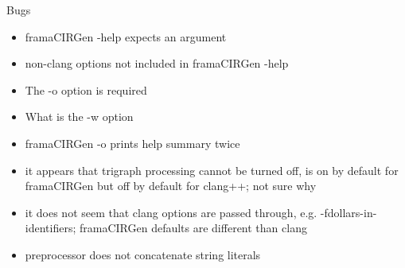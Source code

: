 \documentclass[web]{frama-c-book}
\begin{document}
Bugs
\begin{itemize}
\item framaCIRGen -help expects an argument
\item non-clang options not included in framaCIRGen -help
\item The -o option is required
\item What is the -w option
\item framaCIRGen -o prints help summary twice
\item it appears that trigraph processing cannot be turned off, is on by default for framaCIRGen but off by default for clang++; not sure why
\item it does not seem that clang options are passed through, e.g. -fdollars-in-identifiers; framaCIRGen defaults are different than clang
\item preprocessor does not concatenate string literals
\end{itemize}












\appendix




\cleardoublepage
{}






\cleardoublepage
{}
\printindex
\end{document}

